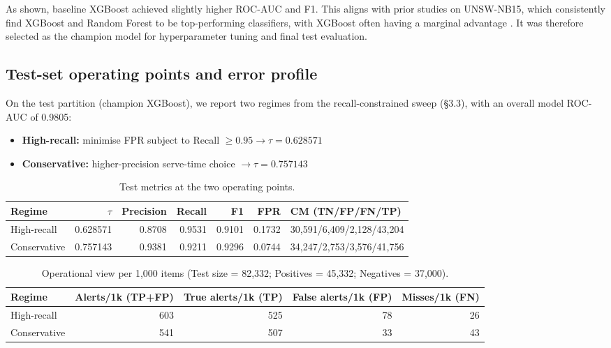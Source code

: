 \documentclass{article}
\begin{document}
As shown, baseline XGBoost achieved slightly higher ROC-AUC and F1. This aligns with prior studies on UNSW-NB15, which consistently find XGBoost and Random Forest to be top-performing classifiers, with XGBoost often having a marginal advantage \cite{ajagbe2024, soon2024}. It was therefore selected as the champion model for hyperparameter tuning and final test evaluation.

\subsection{Test-set operating points and error profile}
On the test partition (champion XGBoost), we report two regimes from the recall-constrained sweep (\S3.3), with an overall model ROC-AUC of 0.9805:
\begin{itemize}
    \item \textbf{High-recall:} minimise FPR subject to Recall $\ge 0.95 \to \tau = 0.628571$
    \item \textbf{Conservative:} higher-precision serve-time choice $\to \tau = 0.757143$
\end{itemize}

\begin{table}[ht!]
\caption{Test metrics at the two operating points.}
\label{tab:test_metrics}
\centering
\begin{tabular}{lrrrrrl}
\toprule
Regime & $\tau$ & Precision & Recall & F1 & FPR & CM (TN/FP/FN/TP) \\
\midrule
High-recall & 0.628571 & 0.8708 & 0.9531 & 0.9101 & 0.1732 & 30,591/6,409/2,128/43,204 \\
Conservative & 0.757143 & 0.9381 & 0.9211 & 0.9296 & 0.0744 & 34,247/2,753/3,576/41,756 \\
\bottomrule
\end{tabular}
\end{table}

\begin{table}[ht!]
\caption{Operational view per 1,000 items (Test size = 82,332; Positives = 45,332; Negatives = 37,000).}
\label{tab:operational_view}
\centering
\begin{tabular}{lrrrr}
\toprule
Regime & Alerts/1k (TP+FP) & True alerts/1k (TP) & False alerts/1k (FP) & Misses/1k (FN) \\
\midrule
High-recall & 603 & 525 & 78 & 26 \\
Conservative & 541 & 507 & 33 & 43 \\
\bottomrule
\end{tabular}
\end{table}
\end{document}
